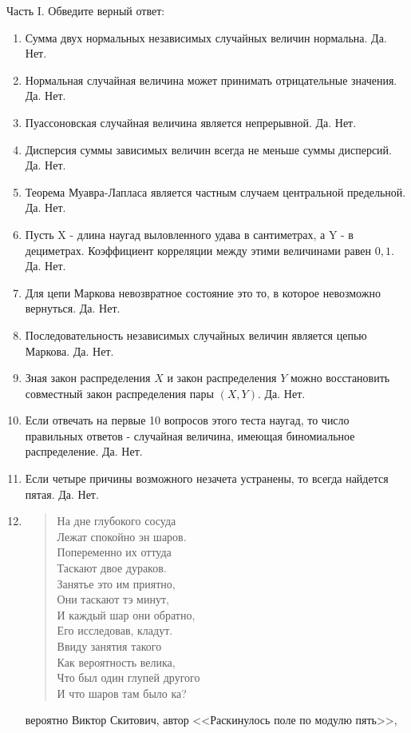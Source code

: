 \documentclass[pdftex,12pt,a4paper]{article}
\begin{document}
Часть I. Обведите верный ответ:
\begin{enumerate}
\item Сумма двух нормальных независимых случайных величин нормальна. Да. Нет.

\item Нормальная случайная величина может принимать отрицательные значения. Да. Нет.

\item Пуассоновская случайная величина является непрерывной. Да. Нет.

\item Дисперсия суммы зависимых величин всегда не меньше суммы дисперсий. Да. Нет.

\item Теорема Муавра-Лапласа является частным случаем центральной предельной. Да. Нет.

\item Пусть X - длина наугад выловленного удава в сантиметрах, а Y - в дециметрах. Коэффициент корреляции между этими величинами равен $0,1$. Да. Нет.

\item Для цепи Маркова невозвратное состояние это то, в которое невозможно вернуться. Да. Нет.

\item Последовательность  независимых случайных величин является цепью Маркова. Да. Нет.

\item Зная закон распределения $X$ и закон распределения $Y$ можно восстановить совместный
закон распределения пары $(X,Y)$. Да. Нет.

\item Если отвечать на первые 10 вопросов этого теста наугад, то число правильных ответов - случайная величина, имеющая биномиальное распределение. Да. Нет.

\item Если четыре причины возможного незачета устранены, то всегда найдется пятая. Да. Нет.

\item 
\begin{flushleft}
\begin{verse}
На дне глубокого сосуда \\
Лежат спокойно эн шаров. \\
Попеременно их оттуда \\
Таскают двое дураков. \\
Занятье это им приятно, \\
Они таскают тэ минут, \\
И каждый шар они обратно, \\
Его исследовав, кладут. \\
Ввиду занятия такого \\
Как вероятность велика, \\
Что был один глупей другого \\
И что шаров там было ка? 
\end{verse}
\end{flushleft}
вероятно Виктор Скитович, автор <<Раскинулось поле по модулю пять>>, 


\end{enumerate}
\end{document}
